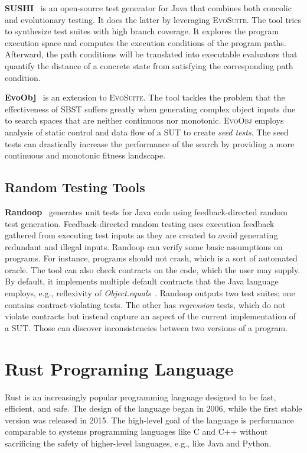 \documentclass[paper=a4,%
  twoside,%
  BCOR4mm,%
  abstract=true,%
  toc=bibliography,%
  chapterprefix=true,%
  toc=bibliographynumbered,%
  open=right,%
  english,%
  pagesize=pdftex]{scrreprt}
\newcommand{\sut}{\ac{SUT}\xspace}
\begin{document}
\textbf{SUSHI}~\cite{Braione2018} is an open-source test generator for Java that combines both concolic and evolutionary testing. It does the latter by leveraging \textsc{EvoSuite}. The tool tries to synthesize test suites with high branch coverage. It explores the program execution space and computes the execution conditions of the program paths. Afterward, the path conditions will be translated into executable evaluators that quantify the distance of a concrete state from satisfying the corresponding path condition.

\textbf{EvoObj}~\cite{Lin2021} is an extension to \textsc{EvoSuite}. The tool tackles the problem that the effectiveness of \ac{SBST} suffers greatly when generating complex object inputs due to search spaces that are neither continuous nor monotonic. \textsc{EvoObj} employs analysis of static control and data flow of a \sut to create \emph{seed tests}. The seed tests can drastically increase the performance of the search by providing a more continuous and monotonic fitness landscape.

\section{Random Testing Tools}
\textbf{Randoop}~\cite{Pacheco_2007} generates unit tests for Java code using feedback-directed random test generation. Feedback-directed random testing uses execution feedback gathered from executing test inputs as they are created to avoid generating redundant and illegal inputs. Randoop can verify some basic assumptions on programs. For instance, programs should not crash, which is a sort of automated oracle. The tool can also check  contracts on the code, which the user may supply. By default, it implements multiple default contracts that the Java language employs, e.g., reflexivity of \emph{Object.equals}~\cite{Fraser2013}. Randoop outputs two test suites; one contains contract-violating tests. The other has \emph{regression} tests, which do not violate contracts but instead capture an aspect of the current implementation of a \sut. Those can discover inconsistencies between two versions of a program.


\clearpage
\chapter{Rust Programing Language}
\label{chap:rust-programming-language}
Rust is an increasingly popular programming language designed to be fast, efficient, and safe. The design of the language began in 2006, while the first stable version was released in 2015. The high-level goal of the language is performance comparable to systems programming languages like C and C++ without sacrificing the safety of higher-level languages, e.g., like Java and Python.
\end{document}

